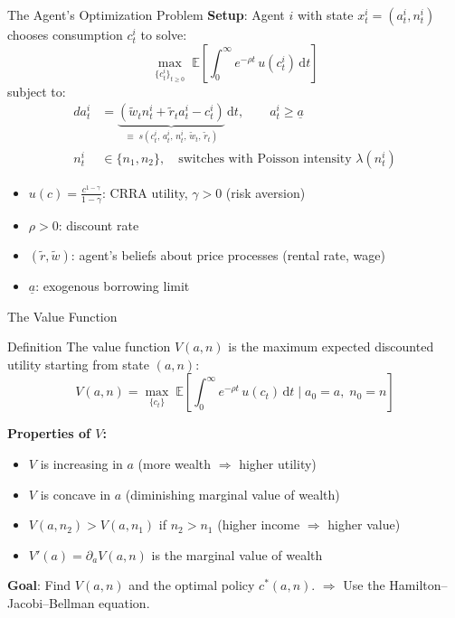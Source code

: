 \documentclass[aspectratio=169,11pt]{beamer}
\newcommand{\emphc}[1]{\textcolor{harvardcrimson}{#1}}
\newcommand{\E}[1]{\mathbb{E}\!\left[#1\right]}
\newcommand{\ud}{\,\mathrm{d}}
\newcommand{\ubar}[1]{\underline{#1}}
\begin{document}
\begin{frame}{The Agent's Optimization Problem}
\textbf{Setup}: Agent $i$ with state $x_t^i = (a_t^i, n_t^i)$ chooses consumption $c_t^i$ to solve:
\[
\max_{\{c_t^i\}_{t\geq 0}} \;\E{\int_0^\infty e^{-\rho t}\,u(c_t^i)\ud t}
\]
subject to:
\begin{align*}
da_t^i &= \underbrace{(\tilde{w}_t n_t^i + \tilde{r}_t a_t^i - c_t^i)}_{\equiv\; s(c_t^i,\, a_t^i,\, n_t^i,\, \tilde{w}_t,\, \tilde{r}_t)}\ud t, \qquad a_t^i \geq \ubar{a} \\[4pt]
n_t^i &\in \{n_1, n_2\}, \quad \text{switches with Poisson intensity } \lambda(n_t^i)
\end{align*}

\vspace{0.2em}
\begin{itemize}\itemsep2pt
    \item $u(c) = \frac{c^{1-\gamma}}{1-\gamma}$: CRRA utility, $\gamma > 0$ (risk aversion)
    \item $\rho > 0$: discount rate
    \item $(\tilde{r}, \tilde{w})$: agent's \emphc{beliefs} about price processes (rental rate, wage)
    \item $\ubar{a}$: exogenous borrowing limit
\end{itemize}
\end{frame}

\begin{frame}{The Value Function}
\small
\begin{block}{Definition}
The \emphc{value function} $V(a, n)$ is the maximum expected discounted utility starting from state $(a,n)$:
\[
V(a, n) = \max_{\{c_t\}} \;\E{\int_0^\infty e^{-\rho t}\,u(c_t)\ud t \;\Big|\; a_0 = a,\; n_0 = n}
\]
\end{block}

\vspace{0.3em}
\textbf{Properties of $V$:}
\begin{itemize}\itemsep2pt
    \item $V$ is \emphc{increasing} in $a$ (more wealth $\Rightarrow$ higher utility)
    \item $V$ is \emphc{concave} in $a$ (diminishing marginal value of wealth)
    \item $V(a, n_2) > V(a, n_1)$ if $n_2 > n_1$ (higher income $\Rightarrow$ higher value)
    \item $V'(a) = \partial_a V(a,n)$ is the \emphc{marginal value of wealth}
\end{itemize}

\vspace{0.2em}
\textbf{Goal}: Find $V(a,n)$ and the optimal policy $c^*(a,n)$.
$\Rightarrow$ Use the \emphc{Hamilton--Jacobi--Bellman equation}.
\end{frame}
\end{document}
